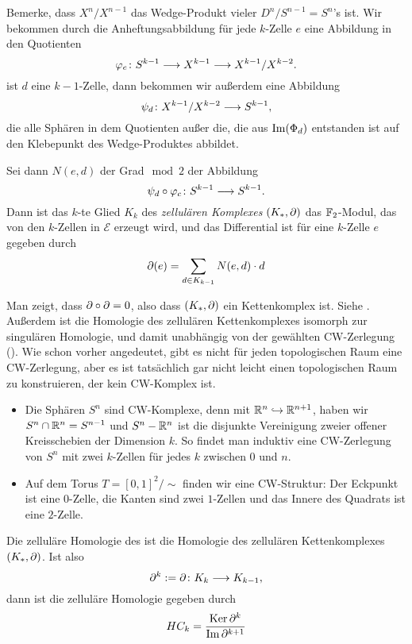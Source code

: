 \begin{definition}
    \label{def: zellulaerer kettenkomplex}
    Bemerke, dass $X^n / X^{n - 1}$ das Wedge-Produkt vieler $D^n / S^{n-1} = S^n$'s ist. 
    Wir bekommen durch die Anheftungsabbildung für jede $k$-Zelle $e$ eine Abbildung in den 
    Quotienten
    \[ \varphi_e \colon S^{k-1} \longrightarrow X^{k - 1} \longrightarrow X^{k - 1} / X^{k - 2} . \]
    ist $d$ eine $k - 1$-Zelle, dann bekommen wir außerdem eine Abbildung 
    \[ \psi_d \colon X^{k - 1} / X^{k - 2} \longrightarrow S^{k - 1} , \]
    die alle Sphären in dem Quotienten außer die, die aus ${ \operatorname{Im} } (\Phi_d)$ entstanden ist
    auf den Klebepunkt des Wedge-Produktes abbildet.

    Sei dann $N(e, d)$ der Grad$\mod 2$ der Abbildung
    \[ \psi_d \circ \varphi_c \colon S^{k - 1} \longrightarrow S^{k - 1} . \]
    Dann ist das $k$-te Glied $K_k$ des \textit{zellulären Komplexes} $(K_{\ast}, { \partial })$ das 
    ${ \mathbb F }_2$-Modul, das von den $k$-Zellen in $\mathcal{E}$ erzeugt wird, und das Differential ist für 
    eine $k$-Zelle $e$ gegeben durch
    \[ { \partial } (e) = \sum_{d \in K_{k  - 1}} N(e, d) \cdot d \] 
\end{definition}

\begin{remark}
    Man zeigt, dass ${ \partial } \circ { \partial } = 0$, also dass $(K_{\ast}, { \partial })$ ein Kettenkomplex ist. 
    Siehe \cite{dold}. Außerdem ist die Homologie des zellulären Kettenkomplexes isomorph zur 
    singulären Homologie, und damit unabhängig von der gewählten CW-Zerlegung (\cite{hatcher}). 
    Wie schon vorher angedeutet, gibt es nicht für jeden topologischen Raum eine CW-Zerlegung,
    aber es ist tatsächlich gar nicht leicht einen topologischen Raum zu konstruieren, der 
    kein CW-Komplex ist.
\end{remark}

\begin{example}
    \begin{itemize}
        \item Die Sphären $S^n$ sind CW-Komplexe, denn mit ${ \mathbb R }^n \hookrightarrow { \mathbb R }^{n + 1}$,
            haben wir $S^n \cap { \mathbb R }^n = S^{n - 1}$ und $S^n - { \mathbb R }^n$ ist die disjunkte Vereinigung
            zweier offener Kreisschebien der Dimension $k$. So findet man induktiv eine CW-Zerlegung
            von $S^n$ mit zwei $k$-Zellen für jedes $k$ zwischen $0$ und $n$.
        \item Auf dem Torus $T = [0, 1]^2 / \sim$ finden wir eine CW-Struktur:
            Der Eckpunkt ist eine $0$-Zelle, die Kanten sind zwei $1$-Zellen und das Innere des 
            Quadrats ist eine $2$-Zelle.
    \end{itemize}
\end{example}

\begin{definition}
    Die zelluläre Homologie des ist die Homologie des zellulären Kettenkomplexes $(K_{\ast}, { \partial })$.
    Ist also
    \[ { \partial }^k := { \partial } \colon K_k \longrightarrow K_{k - 1} , \]
    dann ist die zelluläre Homologie gegeben durch 
    \[ HC_k = \frac{ { \operatorname{Ker} } \, { \partial }^k }{ { \operatorname{Im} } \, { \partial }^{k + 1} } \]
\end{definition}
